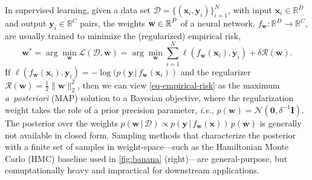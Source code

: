\documentclass{article}
\makeatletter
\newcommand{\ie}{\textit{i.e.\@}\xspace}
\newcommand{\dataset}{\ensuremath{\mathcal{D}}}
\newcommand{\inputDomain}{\ensuremath{\mathbb{R}^{D}}}
\newcommand{\outputDomain}{\ensuremath{\mathbb{R}^{C}}}
\newcommand{\weights}{\ensuremath{\mathbf{w}}}
\newcommand{\mbf}[1]{\mathbf{#1}}
\renewcommand{\mid}{\,|\,}
\newcommand{\MI}{\mbf{I}}
\newcommand{\vzeros}{\mbf{0}}
\newcommand{\vx}{\mbf{x}}
\newcommand{\vy}{\mbf{y}}
\newcommand{\vw}{\mbf{w}}
\newcommand{\Norm}{\mathcal{N}}
\makeatother
\begin{document}
%
In supervised learning, given a data set $\dataset = \{(\vx_{i} , \vy_{i})\}_{i=1}^{N}$, with input $\vx_i \in \inputDomain$ and output $\vy_i \in \outputDomain$ pairs, the weights $\weights \in \R^{P}$ of a neural network, $f_\mathbf{w} : \inputDomain \to \outputDomain$, are usually trained to minimize the (regularized) empirical risk,
%
\begin{equation} \label{eq-empirical-risk}
  \weights^{*} = 
  \arg \min_{\weights} \mathcal{L}(\dataset,\weights) =
  \arg \min_{\weights} \textstyle\sum_{i=1}^{N} \ell(f_\weights(\mathbf{x}_{i}), \mathbf{y}_i) + \delta \mathcal{R}(\weights).
\end{equation}
%
If $\ell(f_\weights(\vx_{i}), \vy_i) = -\log(p(\vy \mid f_\weights(\vx_{i}))$ and the regularizer $\mathcal{R}(\weights) = \frac{1}{2}\|\weights\|^{2}_2$, then we can view \cref{eq-empirical-risk} as the maximum {\it a~posteriori} (MAP) solution to a Bayesian objective, where the regularization weight takes the role of a prior precision parameter, \ie, $p(\vw) = \Norm(\vzeros, \delta^{-1} \MI)$.
The posterior over the weights ${p(\vw \mid \dataset) \propto p(\vy \mid f_{\weights}(\vx)) \, p(\weights)}$ is generally not available in closed form. Sampling methods that characterize the posterior with a finite set of samples in weight-space---such as the Hamiltonian Monte Carlo (HMC) baseline used in \cref{fig:banana} (right)---are general-purpose, but comuptationally heavy and impractical for downstream applications.
\end{document}
